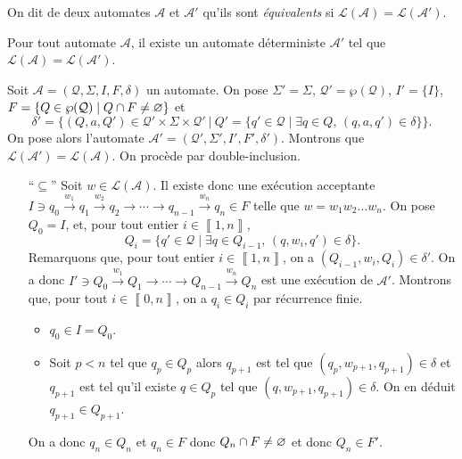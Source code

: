 \begin{defn}
	On dit de deux automates $\mathcal{A}$\/ et $\mathcal{A}'$\/ qu'ils sont {\it équivalents}\/ si $\mathcal{L}(\mathcal{A}) = \mathcal{L}(\mathcal{A}')$.
\end{defn}

\begin{thm}
	Pour tout automate $\mathcal{A}$, il existe un automate déterministe $\mathcal{A}'$\/ tel que $\mathcal{L}(\mathcal{A}) = \mathcal{L}(\mathcal{A}')$.
\end{thm}

\begin{prv}
	Soit $\mathcal{A} = (\mathcal{Q}, \Sigma, I, F, \delta)$\/ un automate.
	On pose $\Sigma' = \Sigma$, $\mathcal{Q}' = \wp(\mathcal{Q})$, $I' = \{I\}$, $F = \{Q \in \wp(\mathcal{Q})  \mid  Q \cap F \neq \varnothing\}$\/ et \[
		\delta' = \bigg\{(Q,a, Q') \in \mathcal{Q}'\times \Sigma\times\mathcal{Q}'\:\bigg|\:Q' = \big\{q' \in \mathcal{Q}  \mid \exists q \in Q,\,(q,a,q') \in \delta\big\}\bigg\}
	.\]
	On pose alors l'automate $\mathcal{A}' = (\mathcal{Q}',\Sigma',I',F',\delta')$. Montrons que $\mathcal{L}(\mathcal{A}') = \mathcal{L}(\mathcal{A})$. On procède par double-inclusion.
	\begin{itemize}
		\item[``$\subseteq$''] Soit $w \in \mathcal{L}(\mathcal{A})$. Il existe donc une exécution acceptante $I \ni q_0\xrightarrow{w_1}q_1\xrightarrow{w_2}q_2\to\cdots\to q_{n-1}\xrightarrow{w_n}q_n \in F$\/ telle que $w = w_1w_2\ldots w_n$.
			On pose $Q_0 = I$, et, pour tout entier $i \in \left\llbracket 1,n \right\rrbracket$,  \[
				Q_i = \big\{q' \in \mathcal{Q}  \mid \exists q \in Q_{i-1},\,(q,w_i,q') \in \delta\big\}
			.\]
			Remarquons que, pour tout entier $i \in \left\llbracket 1,n \right\rrbracket$, on a $(Q_{i-1},w_i,Q_i) \in \delta'$. On a donc $I' \ni Q_0 \xrightarrow{w_1} Q_1 \to \cdots \to Q_{n-1} \xrightarrow{w_n} Q_n$\/ est une exécution de $\mathcal{A}'$.
			Montrons que, pour tout $i \in \left\llbracket 0,n \right\rrbracket$, on a $q_i \in Q_i$ par récurrence finie.
			\begin{itemize}
				\item $q_0 \in I = Q_0$.
				\item Soit $p < n$\/ tel que $q_p \in Q_p$\/ alors $q_{p+1}$\/ est tel que $(q_p, w_{p+1}, q_{p+1}) \in \delta$\/ et $q_{p+1}$\/ est tel qu'il existe $q \in Q_p$\/ tel que $(q, w_{p+1}, q_{p+1}) \in \delta$. On en déduit $q_{p+1} \in Q_{p+1}$.
			\end{itemize}
			On a donc $q_n \in Q_n$\/ et $q_n \in F$\/ donc $Q_n \cap F \neq \varnothing$\/ et donc $Q_n \in F'$.

\end{itemize}
\end{prv}
